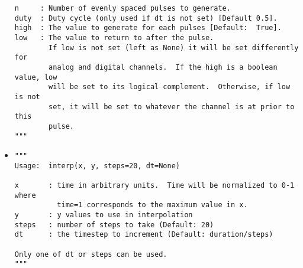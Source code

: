 \begin{itemize}
\begin{lstlisting}
n     : Number of evenly spaced pulses to generate.
duty  : Duty cycle (only used if dt is not set) [Default 0.5].
high  : The value to generate for each pulses [Default:  True].
low   : The value to return to after the pulse.
        If low is not set (left as None) it will be set differently for
        analog and digital channels.  If the high is a boolean value, low
        will be set to its logical complement.  Otherwise, if low is not
        set, it will be set to whatever the channel is at prior to this
        pulse.
"""
\end{lstlisting}

\item {}
\begin{lstlisting}
"""
Usage:  interp(x, y, steps=20, dt=None)

x       : time in arbitrary units.  Time will be normalized to 0-1 where
          time=1 corresponds to the maximum value in x.
y       : y values to use in interpolation
steps   : number of steps to take (Default: 20)
dt      : the timestep to increment (Default: duration/steps)

Only one of dt or steps can be used.
"""
\end{lstlisting}

\end{itemize}

